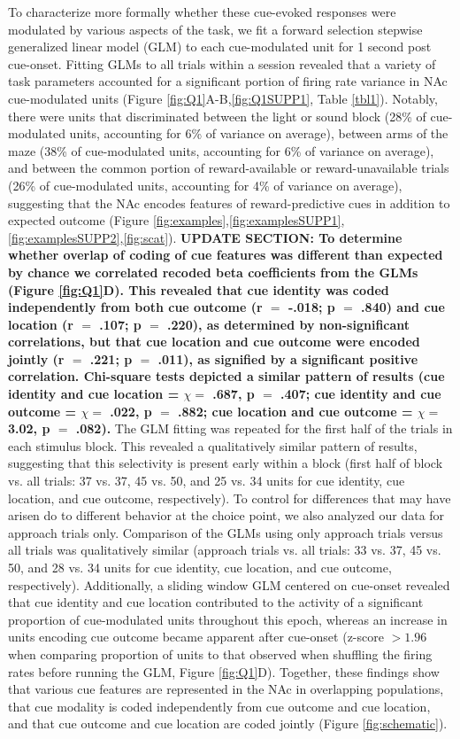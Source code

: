 \documentclass[11pt]{article}
\newcommand{\bsf}[1]{\textbf{#1}}
\begin{document}
To characterize more formally whether these cue-evoked responses were
modulated by various aspects of the task, we fit a forward selection
stepwise generalized linear model (GLM) to each cue-modulated
unit for 1 second post cue-onset. Fitting GLMs to all trials within a session revealed that a
variety of task parameters accounted for a significant portion of
firing rate variance in NAc cue-modulated units (Figure \ref{fig:Q1}A-B,\ref{fig:Q1SUPP1},
Table \ref{tbl1}). Notably, there were units that discriminated
between the light or sound block (28\% of cue-modulated units,
accounting for 6\% of variance on average), between arms of the maze
(38\% of cue-modulated units, accounting for 6\% of variance on
average), and between the common portion of reward-available or
reward-unavailable trials (26\% of cue-modulated units, accounting for
4\% of variance on average), suggesting that the NAc encodes features
of reward-predictive cues in addition to expected outcome (Figure
\ref{fig:examples},\ref{fig:examplesSUPP1},\ref{fig:examplesSUPP2},\ref{fig:scat}). \bsf{UPDATE SECTION: To
determine whether overlap of coding of cue features was different than
expected by chance we correlated recoded beta coefficients from the
GLMs (Figure \ref{fig:Q1}D). This revealed that cue identity was
coded independently from both cue outcome (r $=$ -.018; p $=$ .840)
and cue location (r $=$ .107; p $=$ .220), as determined by
non-significant correlations, but that cue location and cue outcome
were encoded jointly (r $=$ .221; p $=$ .011), as signified by a
significant positive correlation. Chi-square tests depicted a similar
pattern of results (cue identity and cue location = $\chi =$ .687, p
$=$ .407; cue identity and cue outcome = $\chi =$ .022, p $=$ .882;
cue location and cue outcome = $\chi =$ 3.02, p $=$ .082).} The GLM
fitting was repeated for the first half of the trials in each stimulus
block. This revealed a qualitatively similar pattern of results,
suggesting that this selectivity is present early within a block
(first half of block vs. all trials: 37 vs. 37, 45 vs. 50, and 25
vs. 34 units for cue identity, cue location, and cue outcome,
respectively). To control for differences that may have arisen do to
different behavior at the choice point, we also analyzed our data for
approach trials only. Comparison of the GLMs using only approach
trials versus all trials was qualitatively similar (approach trials
vs. all trials: 33 vs. 37, 45 vs. 50, and 28 vs. 34 units for cue
identity, cue location, and cue outcome, respectively).  Additionally,
a sliding window GLM centered on cue-onset revealed that cue identity
and cue location contributed to the activity of a significant
proportion of cue-modulated units throughout this epoch, whereas an
increase in units encoding cue outcome became apparent after cue-onset
(z-score $>1.96$ when comparing proportion of units to that observed
when shuffling the firing rates before running the GLM, Figure
\ref{fig:Q1}D). Together, these findings show that various cue
features are represented in the NAc in overlapping populations, that
cue modality is coded independently from cue outcome and cue location,
and that cue outcome and cue location are coded jointly (Figure
\ref{fig:schematic}).
\end{document}
